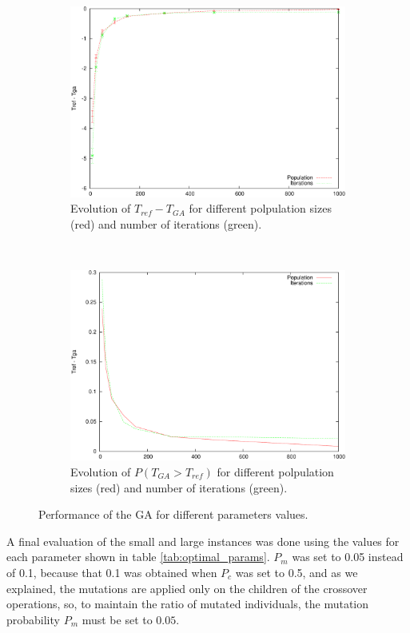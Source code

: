 \documentclass[10pt,a4paper]{article}
\begin{document}
\begin{figure}[h]
\begin{subfigure}[b]{0.45\textwidth}
\includegraphics[width=\textwidth]{results_pop_it_diff.pdf}
\caption{Evolution of $T_{ref}-T_{GA}$ for different polpulation sizes (red) and number of iterations (green).}
\label{fig:evol_pop_it_diff}
\end{subfigure}
~
\begin{subfigure}[b]{0.45\textwidth}
\centering
\includegraphics[width=\textwidth]{results_pop_it_worse.pdf}
\caption{Evolution of $P(T_{GA} > T_{ref})$ for different polpulation sizes (red) and number of iterations (green).}
\label{fig:evol_pop_it_worse}
\end{subfigure}
\caption{Performance of the GA for different parameters values.}
\end{figure}

A final evaluation of the small and large instances was done using the values for each parameter shown in table \ref{tab:optimal_params}. $P_m$ was set to 0.05 instead of 0.1, because that 0.1 was obtained when $P_c$ was set to 0.5, and as we explained, the mutations are applied only on the children of the crossover operations, so, to maintain the ratio of mutated individuals, the mutation probability $P_m$ must be set to $0.05$.\\
\end{document}
